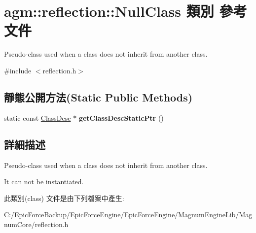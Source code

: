 \hypertarget{classagm_1_1reflection_1_1_null_class}{}\section{agm\+:\+:reflection\+:\+:Null\+Class 類別 參考文件}
\label{classagm_1_1reflection_1_1_null_class}


Pseudo-\/class used when a class does not inherit from another class.  




{\ttfamily \#include $<$reflection.\+h$>$}

\subsection*{靜態公開方法(Static Public Methods)}
\begin{DoxyCompactItemize}
\item 
static const \hyperlink{classagm_1_1reflection_1_1_class_desc}{Class\+Desc} $\ast$ {\bfseries get\+Class\+Desc\+Static\+Ptr} ()\hypertarget{classagm_1_1reflection_1_1_null_class_a328a9a88e9c7d6f3de248076cd88c2f1}{}\label{classagm_1_1reflection_1_1_null_class_a328a9a88e9c7d6f3de248076cd88c2f1}

\end{DoxyCompactItemize}


\subsection{詳細描述}
Pseudo-\/class used when a class does not inherit from another class. 

It can not be instantiated. 

此類別(class) 文件是由下列檔案中產生\+:\begin{DoxyCompactItemize}
\item 
C\+:/\+Epic\+Force\+Backup/\+Epic\+Force\+Engine/\+Epic\+Force\+Engine/\+Magnum\+Engine\+Lib/\+Magnum\+Core/reflection.\+h\end{DoxyCompactItemize}
